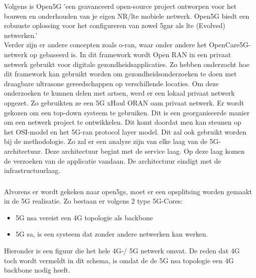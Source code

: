 Volgens \textcite{Open5GS2024} is Open5G 'een geavanceerd open-source project ontworpen voor het bouwen en onderhouden van je eigen NR/\gls{lte} mobiele netwerk. Open5G biedt een robuuste oplossing voor het configureren van zowel \gls{5gnr} als \gls{lte} (Evolved) netwerken.' \\ Verder zijn er andere concepten zoals \gls{o-ran}, waar onder andere het OpenCare5G-netwerk op gebaseerd is. In dit framework wordt Open RAN in een privaat netwerk gebruikt voor digitale gezondheidsapplicaties. Zo hebben \textcite{de2023opencare5g} onderzocht hoe dit framework kan gebruikt worden om gezondheidsonderzoeken te doen met draagbare ultrasone gereedschappen op verschillende locaties. Om deze onderzoeken te kunnen delen met artsen, werd er een lokaal privaat netwerk opgezet. Zo gebruikten ze een 5G xHaul ORAN \gls{oam} privaat netwerk. Er wordt gekozen om een top-down systeem te gebruiken. Dit is een georganiseerde manier om een netwerk project te ontwikkelen. Dit komt doordat men kan steunen op het OSI-model en het 5G-\gls{ran} protocol layer model. Dit zal ook gebruikt worden bij de methodologie. Zo zal er een analyse zijn van elke laag van de 5G-architectuur. Deze architectuur begint met de service laag. Op deze laag komen de verzoeken van de applicatie vandaan. De architectuur eindigt met de infrastructuurlaag. \autocite{de2023opencare5g}

\subsubsection{}
\label{sec:open5gs}

Alvorens er wordt gekeken naar \gls{open5gs}, moet er een opsplitsing worden gemaakt in de 5G realisatie.
Zo bestaan er volgens \textcite{Lee2025a} 2 type 5G-Cores:

\begin{itemize}
  \item 5G \gls{nsa} vereist een 4G topologie als backbone
  \item 5G \gls{sa}, is een systeem dat zonder andere netwerken kan werken.
\end{itemize}

Hieronder is een figuur die het hele 4G-/ 5G netwerk omvat. De reden dat 4G toch wordt vermeldt in dit schema, is omdat de de 5G \gls{nsa} topologie een 4G backbone nodig heeft. \autocite{Lee2025a}

